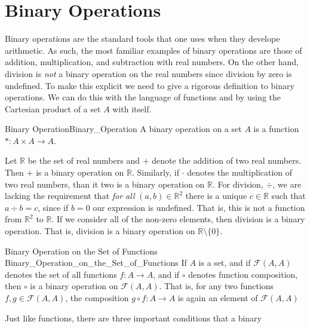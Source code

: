 \section{Binary Operations}
    Binary operations are the standard tools that one uses when they develope
    arithmetic. As such, the most familiar examples of binary operations are
    those of addition, multiplication, and subtraction with real numbers.
    On the other hand, division is \textit{not} a binary operation on the real
    numbers since division by zero is undefined. To make this explicit we need
    to give a rigorous definition to binary operations. We can do this with the
    language of functions and by using the Cartesian product
     of a set $A$ with itself.
    \begin{fdefinition}{Binary Operation}{Binary_Operation}
        A \gls{binary operation} on a set $A$ is a function
        $*:A\times{A}\rightarrow{A}$.
    \end{fdefinition}
    \begin{example}
        Let $\mathbb{R}$ be the set of real numbers and $+$ denote the addition
        of two real numbers. Then $+$ is a binary operation on $\mathbb{R}$.
        Similarly, if $\cdot$ denotes the multiplication of two real numbers,
        than it two is a binary operation on $\mathbb{R}$. For division, $\div$,
        we are lacking the requirement that \textit{for all}
        $(a,b)\in\mathbb{R}^{2}$ there is a unique $c\in\mathbb{R}$ such that
        $a\div{b}=c$, since if $b=0$ our expression is undefined. That is, this
        is not a function from $\mathbb{R}^{2}$ to $\mathbb{R}$. If we consider
        all of the non-zero elements, then division is a binary operation. That
        is, division is a binary operation on $\mathbb{R}\setminus\{0\}$.
    \end{example}
    \begin{lexample}{Binary Operation on the Set of Functions}
                    {Binary_Operation_on_the_Set_of_Functions}
        If $A$ is a set, and if $\mathcal{F}(A,A)$ denotes the set of all
        functions $f:A\rightarrow{A}$, and if $\circ$ denotes function
        composition, then $\circ$ is a binary operation on $\mathcal{F}(A,A)$.
        That is, for any two functions $f,g\in\mathcal{F}(A,A)$, the composition
        $g\circ{f}:A\rightarrow{A}$ is again an element of $\mathcal{F}(A,A)$
    \end{lexample}
    Just like functions, there are three important conditions that a binary
